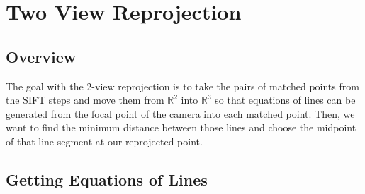 \chapter{Two View Reprojection}

\section{Overview}
The goal with the 2-view reprojection is to take the pairs of matched points from the SIFT steps and
move them from $\mathbb{R}^{2}$ into $\mathbb{R}^{3}$ so that equations of lines can be generated from the
focal point of the camera into each matched point. Then, we want to find the minimum distance between those
lines and choose the midpoint of that line segment at our reprojected point.

\section{Getting Equations of Lines}

